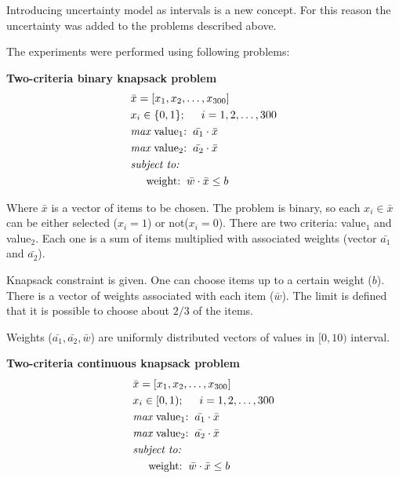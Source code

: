 Introducing uncertainty model as intervals is a new concept. For this reason
the uncertainty was added to the problems described above.

The experiments were performed using following problems:
\begin{description}
  \item{\textbf{Two-criteria binary knapsack problem}}
    \begin{align*}
      & \bar{x} = [x_1, x_2, \dots, x_{300}]  \\
      & x_i \in \{0, 1\};  \hspace{0.5cm} i = 1, 2, \dots, 300 \\
      & \textit{max}\text{ value$_1$:} \hspace{0.2cm} \bar{a_1} \cdot \bar{x} \\
      & \textit{max}\text{ value$_2$:} \hspace{0.2cm} \bar{a_2} \cdot \bar{x} \\
      & \textit{subject to:} \\
      & \hspace{0.5cm} \text{weight:} \hspace{0.2cm} \bar{w} \cdot \bar{x} \leq b
    \end{align*}
    
    Where $\bar{x}$ is a vector of items to be chosen. The problem is binary,
    so each $x_i \in \bar{x}$ can be either selected ($x_i = 1$) or not($x_i
    = 0$). There are two criteria: value$_1$ and value$_2$. Each one is a sum
    of items multiplied with associated weights (vector $\bar{a_1}$ and
    $\bar{a_2}$).

    Knapsack constraint is given. One can choose items up to a certain weight
    ($b$). There is a vector of weights associated with each item
    ($\bar{w}$). The limit is defined that it is possible to choose about
    $2/3$ of the items.

    Weights ($\bar{a_1}, \bar{a_2}, \bar{w}$) are uniformly distributed
    vectors of values in $[0,10)$ interval.


  \item{\textbf{Two-criteria continuous knapsack problem}}
    \begin{align*}
      & \bar{x} = [x_1, x_2, \dots, x_{300}]  \\
      & x_i \in [0, 1);  \hspace{0.5cm} i = 1, 2, \dots, 300 \\
      & \textit{max}\text{ value$_1$:} \hspace{0.2cm} \bar{a_1} \cdot \bar{x} \\
      & \textit{max}\text{ value$_2$:} \hspace{0.2cm} \bar{a_2} \cdot \bar{x} \\
      & \textit{subject to:} \\
      & \hspace{0.5cm} \text{weight:}  \hspace{0.2cm} \bar{w} \cdot \bar{x} \leq b
    \end{align*}


\end{description}
